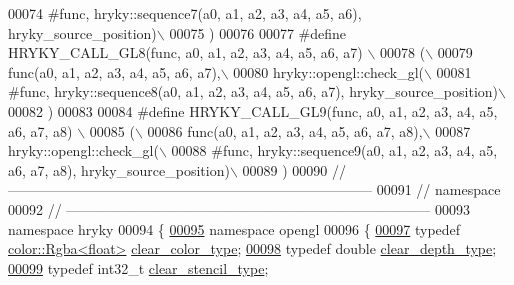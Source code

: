 \begin{DoxyCode}
00074 \textcolor{preprocessor}{        #func, hryky::sequence7(a0, a1, a2, a3, a4, a5, a6),
       hryky\_source\_position)\(\backslash\)}
00075 \textcolor{preprocessor}{     )}
00076 \textcolor{preprocessor}{}
00077 \textcolor{preprocessor}{#define HRYKY\_CALL\_GL8(func, a0, a1, a2, a3, a4, a5, a6, a7) \(\backslash\)}
00078 \textcolor{preprocessor}{    (\(\backslash\)}
00079 \textcolor{preprocessor}{     func(a0, a1, a2, a3, a4, a5, a6, a7),\(\backslash\)}
00080 \textcolor{preprocessor}{     hryky::opengl::check\_gl(\(\backslash\)}
00081 \textcolor{preprocessor}{        #func, hryky::sequence8(a0, a1, a2, a3, a4, a5, a6, a7),
       hryky\_source\_position)\(\backslash\)}
00082 \textcolor{preprocessor}{     )}
00083 \textcolor{preprocessor}{}
00084 \textcolor{preprocessor}{#define HRYKY\_CALL\_GL9(func, a0, a1, a2, a3, a4, a5, a6, a7, a8) \(\backslash\)}
00085 \textcolor{preprocessor}{    (\(\backslash\)}
00086 \textcolor{preprocessor}{     func(a0, a1, a2, a3, a4, a5, a6, a7, a8),\(\backslash\)}
00087 \textcolor{preprocessor}{     hryky::opengl::check\_gl(\(\backslash\)}
00088 \textcolor{preprocessor}{        #func, hryky::sequence9(a0, a1, a2, a3, a4, a5, a6, a7, a8),
       hryky\_source\_position)\(\backslash\)}
00089 \textcolor{preprocessor}{     )}
00090 \textcolor{preprocessor}{}\textcolor{comment}{//
      ------------------------------------------------------------------------------}
00091 \textcolor{comment}{// namespace}
00092 \textcolor{comment}{//
      ------------------------------------------------------------------------------}
00093 \textcolor{keyword}{namespace }hryky
00094 \{
\hypertarget{opengl__common_8h_source_l00095}{}\hyperlink{namespacehryky_1_1opengl}{00095} \textcolor{keyword}{namespace }opengl
00096 \{
\hypertarget{opengl__common_8h_source_l00097}{}\hyperlink{namespacehryky_1_1opengl_acab4d3df4193bd85d7261be485efca10}{00097}     \textcolor{keyword}{typedef} \hyperlink{classhryky_1_1color_1_1_rgba}{color::Rgba<float>}      \hyperlink{namespacehryky_1_1opengl_acab4d3df4193bd85d7261be485efca10}{clear_color_type};   
\hypertarget{opengl__common_8h_source_l00098}{}\hyperlink{namespacehryky_1_1opengl_a5d4a0c96ecaa596a64f1efed8a51c089}{00098}     \textcolor{keyword}{typedef} \textcolor{keywordtype}{double}                  \hyperlink{namespacehryky_1_1opengl_a5d4a0c96ecaa596a64f1efed8a51c089}{clear_depth_type};   
\hypertarget{opengl__common_8h_source_l00099}{}\hyperlink{namespacehryky_1_1opengl_a7340c1159eebfb6a57358d75a1b0629a}{00099}     \textcolor{keyword}{typedef} int32\_t                 \hyperlink{namespacehryky_1_1opengl_a7340c1159eebfb6a57358d75a1b0629a}{clear_stencil_type}; 

\end{DoxyCode}
